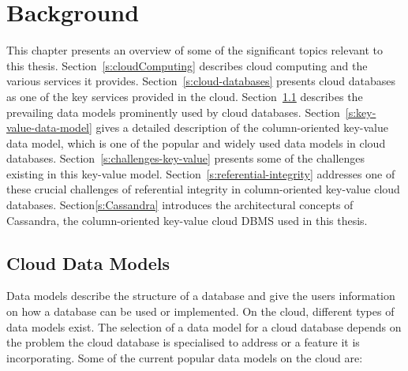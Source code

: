 \chapter{Background} \label{c:background}

This chapter  presents an overview of some of the significant topics relevant to
this thesis. Section~\ref{s:cloudComputing} describes cloud computing and the
various services it provides. Section~\ref{s:cloud-databases} presents cloud
databases as one of the key services provided in the cloud.
Section~\ref{s:cloud-data-models} describes the prevailing data models
prominently used by cloud databases. Section~\ref{s:key-value-data-model} gives
a detailed description of the column-oriented key-value data model, which is one
of the popular and widely used data models in cloud databases.
Section~\ref{s:challenges-key-value} presents some of the challenges existing in
this key-value model.
Section~\ref{s:referential-integrity} addresses one of these crucial challenges
of referential integrity in column-oriented key-value cloud databases.
Section\ref{s:Cassandra} introduces the architectural concepts of Cassandra, the
column-oriented key-value cloud \ac{DBMS} used in this thesis.









\section{Cloud Data Models}\label{s:cloud-data-models}
Data models describe the structure of a database and give the users information
on how a database can be used or implemented.  On the cloud,   different types
of data models exist.  The selection of a data model for a cloud database
depends on the problem the cloud database is specialised to address or a feature
it is incorporating.  Some of the current popular data models on the cloud are:

